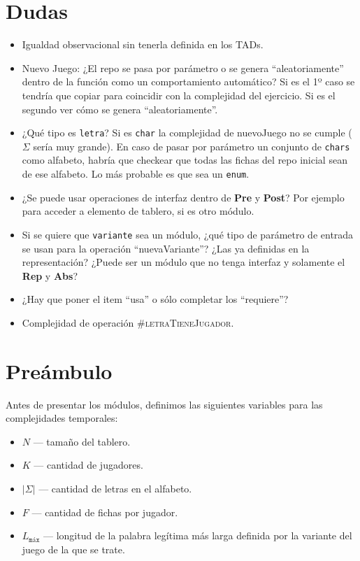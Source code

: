 \section{Dudas}
\begin{itemize}
        \item Igualdad observacional sin tenerla definida en los TADs.
        \item Nuevo Juego: ¿El repo se pasa por parámetro o se genera ``aleatoriamente'' dentro de la función como un comportamiento automático? Si es el 1º caso se tendría que copiar para coincidir con la complejidad del ejercicio. Si es el segundo ver cómo se genera ``aleatoriamente''.
        \item ¿Qué tipo es \texttt{letra}? Si es \texttt{char} la complejidad de nuevoJuego no se cumple ($\Sigma$ sería muy grande). En caso de pasar por parámetro un conjunto de \texttt{chars} como alfabeto, habría que checkear que todas las fichas del repo inicial sean de ese alfabeto. Lo más probable es que sea un \texttt{enum}.
        \item ¿Se puede usar operaciones de interfaz dentro de \textbf{Pre} y \textbf{Post}? Por ejemplo para acceder a elemento de tablero, si es otro módulo.
        \item Si se quiere que \texttt{variante} sea un módulo, ¿qué tipo de parámetro de entrada se usan para la operación ``nuevaVariante''? ¿Las ya definidas en la representación? ¿Puede ser un módulo que no tenga interfaz y solamente el \textbf{Rep} y \textbf{Abs}?
        \item ¿Hay que poner el item ``usa'' o sólo completar los ``requiere''?
        \item Complejidad de operación \textsc{\#letraTieneJugador}.
\end{itemize}

\section{Preámbulo}
Antes de presentar los módulos, definimos las siguientes variables para las complejidades temporales:
\begin{itemize}
    \item $N$ \---- tamaño del tablero.
    \item $K$ \---- cantidad de jugadores.
    \item $|\Sigma|$ \---- cantidad de letras en el alfabeto.
    \item $F$ \---- cantidad de fichas por jugador.
    \item $L_{\texttt{máx}}$ \---- longitud de la palabra legítima más larga definida por la variante del juego de la que se trate.
\end{itemize}

